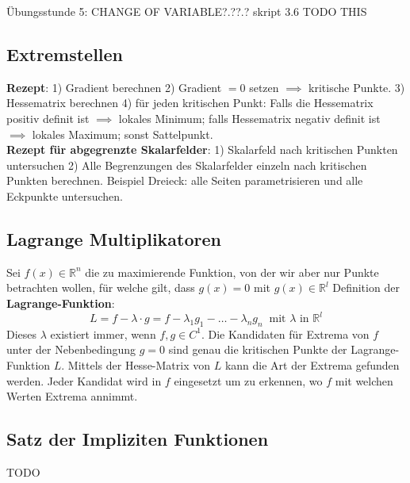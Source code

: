 Übungsstunde 5: CHANGE OF VARIABLE?.??.? skript 3.6 TODO THIS

\subsection{Extremstellen}

\textbf{Rezept}: 1) Gradient berechnen 2) Gradient $=0$ setzen $\implies$ kritische Punkte. 3) Hessematrix berechnen 4) für jeden kritischen Punkt: Falls die Hessematrix positiv definit ist $\implies$ lokales Minimum; falls Hessematrix negativ definit ist $\implies$ lokales Maximum; sonst Sattelpunkt.\\

\textbf{Rezept für abgegrenzte Skalarfelder}: 1) Skalarfeld nach kritischen Punkten untersuchen 2) Alle Begrenzungen des Skalarfelder einzeln nach kritischen Punkten berechnen. Beispiel Dreieck: alle Seiten parametrisieren und alle Eckpunkte untersuchen.

\subsection{Lagrange Multiplikatoren}
Sei $f(x) \in \mathbb{R}^{n}$ die zu maximierende Funktion, von der wir aber nur Punkte
betrachten wollen, für welche gilt, dass $g(x) = 0$ mit $g(x) \in \mathbb{R}^{l}$
Definition der \textbf{Lagrange-Funktion}:
\[ L = f-\lambda \cdot g = f - \lambda_{1} g_{1} - \ldots - \lambda_{n}g_{n} ~ \text{ mit $\lambda$ in } \mathbb{R}^{l} \]
Dieses $\lambda$ existiert immer, wenn $f, g \in C^{1}$.
Die Kandidaten für Extrema von $f$ unter der Nebenbedingung $g = 0$ sind genau die
kritischen Punkte der Lagrange-Funktion $L$. Mittels der Hesse-Matrix von $L$
kann die Art der Extrema gefunden werden. Jeder Kandidat wird in $f$ eingesetzt
um zu erkennen, wo $f$ mit welchen Werten Extrema annimmt.

\subsection{Satz der Impliziten Funktionen}



TODO
